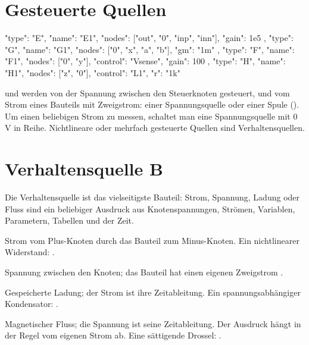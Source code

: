 \section{Gesteuerte Quellen}

\begin{json}
{ "type": "E", "name": "E1", "nodes": ["out", "0", "inp", "inn"], "gain": 1e5 },
{ "type": "G", "name": "G1", "nodes": ["0", "x", "a", "b"], "gm": "1m" },
{ "type": "F", "name": "F1", "nodes": ["0", "y"], "control": "Vsense", "gain": 100 },
{ "type": "H", "name": "H1", "nodes": ["z", "0"], "control": "L1", "r": "1k" }
\end{json}

 und  werden von der Spannung zwischen den Steuerknoten
gesteuert,  und  vom Strom eines Bauteils mit Zweigstrom:
einer Spannungsquelle oder einer Spule (). Um einen beliebigen
Strom zu messen, schaltet man eine Spannungsquelle mit 0\,V in Reihe.
Nichtlineare oder mehrfach gesteuerte Quellen sind Verhaltensquellen.

\section{Verhaltensquelle B}
\label{sec:bquelle}

Die Verhaltensquelle ist das vielseitigste Bauteil: Strom, Spannung, Ladung
oder Fluss sind ein beliebiger Ausdruck aus Knotenspannungen, Strömen,
Variablen, Parametern, Tabellen und der Zeit.

\begin{description}[style=nextline,leftmargin=2em]
  \item[{\code{"i": "..."}}]
    Strom vom Plus-Knoten durch das Bauteil zum Minus-Knoten. Ein
    nichtlinearer Widerstand: .
  \item[{\code{"v": "..."}}]
    Spannung zwischen den Knoten; das Bauteil hat einen eigenen Zweigstrom
    .
  \item[{\code{"q": "..."}}]
    Gespeicherte Ladung; der Strom ist ihre Zeitableitung. Ein
    spannungsabhängiger Kondensator: .
  \item[{\code{"phi": "..."}}]
    Magnetischer Fluss; die Spannung ist seine Zeitableitung. Der Ausdruck
    hängt in der Regel vom eigenen Strom ab. Eine sättigende Drossel:
    .
\end{description}

